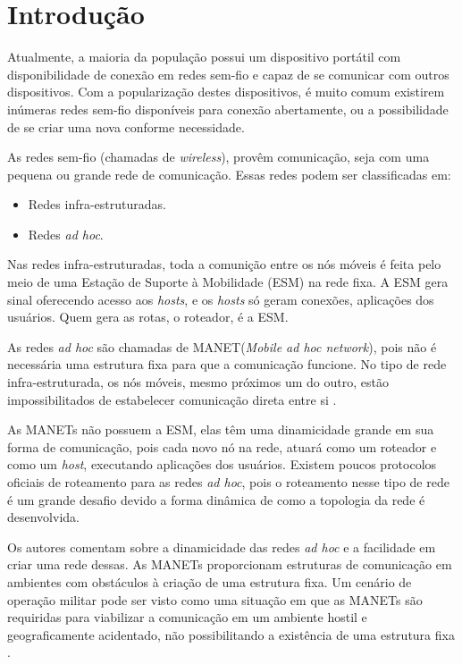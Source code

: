\section{Introdu\c{c}\~ao} 
Atualmente, a maioria da popula\c{c}\~ao possui um dispositivo port\'atil com disponibilidade de conex\~ao em redes sem-fio e capaz de se comunicar com outros dispositivos. 
Com a populariza\c{c}\~ao destes dispositivos, \'e muito comum existirem in\'umeras redes sem-fio dispon\'iveis para conex\~ao abertamente, ou a possibilidade de se criar uma nova conforme necessidade.

As redes sem-fio (chamadas de \textit{wireless}), prov\^em comunica\c{c}\~ao, seja com uma pequena ou grande rede de comunica\c{c}\~ao. 
Essas redes podem ser classificadas em:

\begin{itemize}
	\item Redes infra-estruturadas.
	\item Redes \textit{ad hoc}.
\end{itemize}

Nas redes infra-estruturadas, toda a comuni\c{c}\~ao entre os n\'os m\'oveis \'e feita pelo meio de uma Esta\c{c}\~ao de Suporte \`a Mobilidade (ESM) na rede fixa.
A ESM gera sinal oferecendo acesso aos \textit{hosts}, e os \textit{hosts} s\'o geram conex\~oes, aplica\c{c}\~oes dos usu\'arios. Quem gera as rotas, o roteador, \'e a ESM. 

As redes \textit{ad hoc} s\~ao chamadas de MANET(\textit{Mobile ad hoc network}), pois n\~ao \'e necess\'aria uma estrutura fixa para que a comunica\c{c}\~ao funcione.
No tipo de rede infra-estruturada, os n\'os m\'oveis, mesmo pr\'oximos um do outro, est\~ao impossibilitados de estabelecer comunica\c{c}\~ao direta entre si \cite{pereira}.

As MANETs n\~ao possuem a ESM, elas t\^em uma dinamicidade grande em sua forma de comunica\c{c}\~ao, pois cada novo n\'o na rede, atuar\'a como um roteador e como um \textit{host}, executando aplica\c{c}\~oes dos usu\'arios. 
Existem poucos protocolos oficiais de roteamento para as redes \textit{ad hoc}, pois  o roteamento nesse tipo de rede \'e um grande desafio devido a forma din\^ amica de como a topologia da rede \'e desenvolvida.

Os autores \cite{pepe} comentam sobre a dinamicidade das redes \textit{ad hoc} e a facilidade em criar uma rede dessas.
As MANETs proporcionam estruturas de comunica\c{c}\~ao em ambientes com obst\'aculos \`a cria\c{c}\~ao de uma estrutura fixa.
Um cen\'ario de opera\c{c}\~ao militar pode ser visto como uma situa\c{c}\~ao em que as MANETs s\~ao requiridas para viabilizar a comunica\c{c}\~ao em um ambiente hostil e geograficamente acidentado, n\~ao possibilitando a exist\^encia de uma estrutura fixa \cite{schimidt}.


